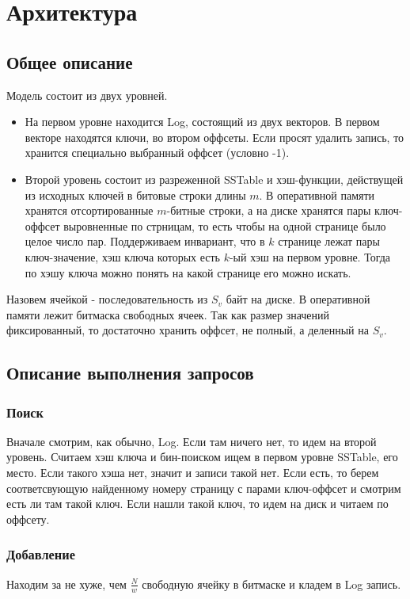\section*{Архитектура}
  \subsection*{Общее описание}
      Модель состоит из двух уровней. 
      \begin{itemize} 
      \item 
        На первом уровне находится Log, состоящий из двух векторов. В первом векторе находятся ключи, во втором оффсеты. Если просят удалить запись, то хранится специально выбранный оффсет (условно -1).
      \item
        Второй уровень состоит из разреженной SSTable и хэш-функции, действущей из исходных ключей в битовые строки длины $m$.
        В оперативной памяти хранятся отсортированные $m$-битные строки, а на диске хранятся пары ключ-оффсет выровненные по стрницам, 
        то есть чтобы на одной странице было целое число пар. Поддерживаем инвариант, что в $k$ странице лежат пары ключ-значение, хэш ключа которых есть $k$-ый хэш на первом уровне. 
        Тогда по хэшу ключа можно понять на какой странице его можно искать.
      \end{itemize}

      Назовем ячейкой - последовательность из $S_v$ байт на диске. В оперативной памяти лежит битмаска свободных ячеек. 
      Так как размер значений фиксированный, то достаточно хранить оффсет, не полный, а деленный на $S_v$.

    \subsection*{Описание выполнения запросов}
      \subsubsection*{Поиск}
        Вначале смотрим, как обычно, Log. Если там ничего нет, то идем на второй уровень. 
        Считаем хэш ключа и бин-поиском ищем в первом уровне SSTable, его место. Если такого хэша нет, значит и записи такой нет.
        Если есть, то берем соответсвующую найденному номеру страницу с парами ключ-оффсет и смотрим есть ли там такой ключ. 
        Если нашли такой ключ, то идем на диск и читаем по оффсету.

      \subsubsection*{Добавление}
        Находим за не хуже, чем $\frac{N}{w}$ свободную ячейку в битмаске и кладем в Log запись.

